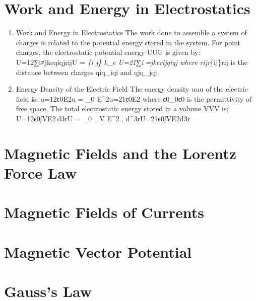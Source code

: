 \documentclass[
  letterpaper,
  DIV=11,
  numbers=noendperiod]{scrreprt}
\begin{document}

\chapter{Work and Energy in
Electrostatics}\label{work-and-energy-in-electrostatics}

\begin{enumerate}
\def\labelenumi{\arabic{enumi}.}
\setcounter{enumi}{9}
\item
  Work and Energy in Electrostatics The work done to assemble a system
  of charges is related to the potential energy stored in the system.
  For point charges, the electrostatic potential energy UUU is given by:
  U=12∑i≠jkeqiqjrijU =  \sum\emph{\{i \neq j\} k\_e
  U=21∑i=jkerijqiqj where rijr}\{ij\}rij is the
  distance between charges qiq\_iqi and qjq\_jqj.
\item
  Energy Density of the Electric Field The energy density uuu of the
  electric field is: u=12ϵ0E2u =  \epsilon\_0 E\^{}2u=21ϵ0E2
  where ϵ0\epsilon\_0ϵ0 is the permittivity of free space. The total
  electrostatic energy stored in a volume VVV is: U=12ϵ0∫VE2 d3rU =
   \epsilon\_0 \int\_V E\^{}2 , d\^{}3rU=21ϵ0∫VE2d3r
\end{enumerate}


\chapter{Magnetic Fields and the Lorentz Force
Law}\label{magnetic-fields-and-the-lorentz-force-law}


\chapter{Magnetic Fields of Currents}\label{magnetic-fields-of-currents}


\chapter{Magnetic Vector Potential}\label{magnetic-vector-potential}


\chapter{Gauss's Law}\label{gausss-law}
\end{document}
